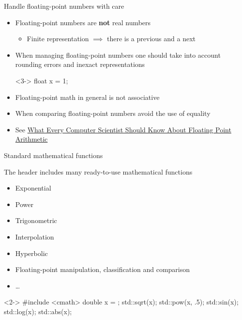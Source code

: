 \begin{frame}[fragile]{Handle floating-point numbers with care}

  \begin{itemize}
  \item<1-> Floating-point numbers are \textbf{not} real numbers
    \begin{itemize}
    \item Finite representation $\implies$ there is a previous and a next
    \end{itemize}
  \item<2-> When managing floating-point numbers one should take into account
    rounding errors and inexact representations
    \begin{codeblock}<3->{
float x = 1;
}\end{codeblock}
  \item<8-> Floating-point math in general is not associative
  \item<9-> When comparing floating-point numbers avoid the use of equality
  \item<10-> See \href{https://cr.yp.to/2005-590/goldberg.pdf}{What Every
      Computer Scientist Should Know About Floating Point Arithmetic}
 \end{itemize}

\end{frame}

\begin{frame}[fragile]{Standard mathematical functions}

  The \href{https://en.cppreference.com/w/cpp/header/cmath}{} header
  includes many ready-to-use mathematical functions
  \begin{itemize}
  \item Exponential
  \item Power
  \item Trigonometric
  \item Interpolation
  \item Hyperbolic
  \item Floating-point manipulation, classification and comparison
  \item \ldots
  \end{itemize}

  \begin{codeblock}<2->{
#include <cmath>
\ddd
double x = \ddd;
std::sqrt(x);
std::pow(x, .5);
std::sin(x);
std::log(x);
std::abs(x);}\end{codeblock}
\end{frame}

